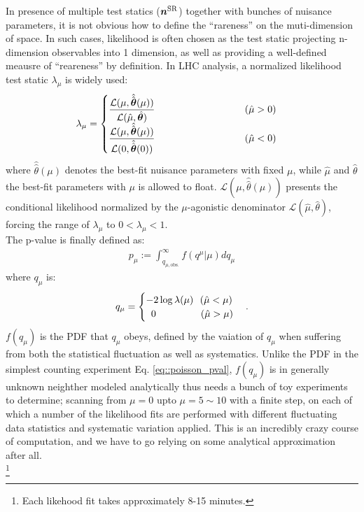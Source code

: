 In presence of multiple test statics ($\bm{n}^{\mathrm{SR}}$) together with bunches of nuisance parameters, it is not obvious how to define the ``rareness'' on the muti-dimension of space. In such cases, likelihood is often chosen as the test static projecting n-dimension observables into 1 dimension, as well as providing a well-defined meausre of ``reareness'' by definition. In LHC analysis, a normalized likelihood test static $\lambda_\mu$ is widely used:
\begin{align}
\lambda_\mu = 
        \begin{cases}
        \dfrac{ \mathcal{L} (\mu, \hat{\hat{\bm{\theta}}}(\mu)) }{ \mathcal{L} (\hat{\mu}, \hat{\bm{\theta}})  }         \mbox{\phantom{MMMMMMMMMM}} (\hat{\mu}>0)        \\
        \dfrac{ \mathcal{L} (\mu, \hat{\hat{\bm{\theta}}}(\mu)) }{ \mathcal{L} (0, \hat{\hat{\bm{\theta}}}(0))  }  \mbox{\phantom{MMMMMMMMMM}} (\hat{\mu}<0)
        \end{cases}
\end{align}
where $\hat{\hat{\theta}}(\mu)$ denotes the best-fit nuisance parameters with fixed $\mu$,
while $\hat{\mu}$ and $\hat{\theta}$ the best-fit parameters with $\mu$ is allowed to float. 
$\mathcal{L} (\mu, \hat{\hat{\theta}}(\mu))$ presents the conditional likelihood normalized by the $\mu$-agonistic denominator $\mathcal{L} (\hat{\mu}, \hat{\theta})$, forcing the range of $\lambda_\mu$ to $0<\lambda_\mu<1$. \\

The p-value is finally defined as:
\begin{align}
p_\mu := \int_{q_{\mu,\mathrm{obs.}}}^{\infty}  f(q^{\mu}|\mu) dq_\mu
\end{align}
where $q_{\mu}$ is:
\begin{align}
q_{\mu} = 
        \begin{cases}
        -2 \log\lambda(\mu)     \,\,\,\,  (\hat{\mu} < \mu) \\
        \mbox{\phantom{k}} 0     \mbox{\phantom{MMMMM}} (\hat{\mu} > \mu)
        \end{cases}
.
\end{align}
$f(q_\mu)$ is the PDF that $q_\mu$ obeys, defined by the vaiation of $q_\mu$ when suffering from both the statistical fluctuation as well as systematics.
Unlike the PDF in the simplest counting experiment Eq. \ref{eq::poisson_pval}, $f(q_\mu)$ is in generally unknown neighther modeled analytically thus needs a bunch of toy experiments to determine; scanning from $\mu=0$ upto $\mu=5\sim 10$ with a finite step, on each of which a number of the likelihood fits are performed with different fluctuating data statistics and systematic variation applied. This is an incredibly crazy course of computation, and we have to go relying on some analytical approximation after all.  \\
\footnote{Each likehood fit takes approximately 8-15 minutes. }

